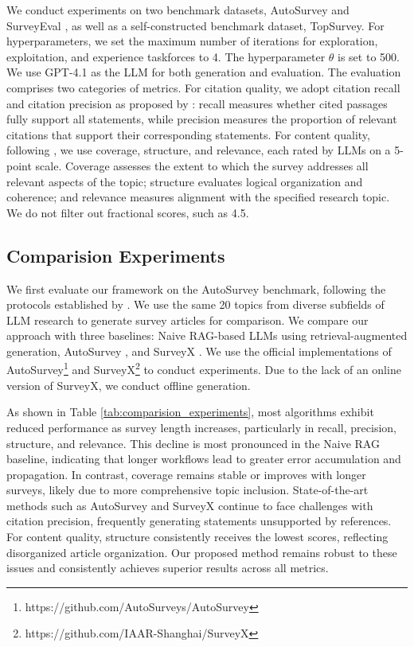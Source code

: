 \documentclass[manuscript,review,anonymous]{acmart}
\begin{document}
We conduct experiments on two benchmark datasets, AutoSurvey \cite{wang2024autosurvey} and SurveyEval \cite{wang2025llm}, as well as a self-constructed benchmark dataset, TopSurvey. For hyperparameters, we set the maximum number of iterations for exploration, exploitation, and experience taskforces to 4. The hyperparameter $\theta$ is set to 500. We use GPT-4.1 as the LLM for both generation and evaluation. The evaluation comprises two categories of metrics. For citation quality, we adopt citation recall and citation precision as proposed by \citet{wang2024autosurvey}: recall measures whether cited passages fully support all statements, while precision measures the proportion of relevant citations that support their corresponding statements. For content quality, following \citet{wang2024autosurvey}, we use coverage, structure, and relevance, each rated by LLMs on a 5-point scale. Coverage assesses the extent to which the survey addresses all relevant aspects of the topic; structure evaluates logical organization and coherence; and relevance measures alignment with the specified research topic. We do not filter out fractional scores, such as 4.5.

\subsection{Comparision Experiments}

We first evaluate our framework on the AutoSurvey \cite{wang2024autosurvey} benchmark, following the protocols established by \citet{liang2025surveyx, wang2024autosurvey}. We use the same 20 topics from diverse subfields of LLM research to generate survey articles for comparison. We compare our approach with three baselines: Naive RAG-based LLMs using retrieval-augmented generation, AutoSurvey \cite{wang2024autosurvey}, and SurveyX \cite{liang2025surveyx}. We use the official implementations of AutoSurvey\footnote{https://github.com/AutoSurveys/AutoSurvey} and SurveyX\footnote{https://github.com/IAAR-Shanghai/SurveyX} to conduct experiments. Due to the lack of an online version of SurveyX, we conduct offline generation.

As shown in Table \ref{tab:comparision_experiments}, most algorithms exhibit reduced performance as survey length increases, particularly in recall, precision, structure, and relevance. This decline is most pronounced in the Naive RAG baseline, indicating that longer workflows lead to greater error accumulation and propagation. In contrast, coverage remains stable or improves with longer surveys, likely due to more comprehensive topic inclusion. State-of-the-art methods such as AutoSurvey and SurveyX continue to face challenges with citation precision, frequently generating statements unsupported by references. For content quality, structure consistently receives the lowest scores, reflecting disorganized article organization. Our proposed method remains robust to these issues and consistently achieves superior results across all metrics.
\end{document}
